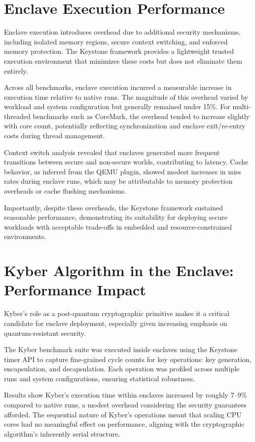 \section{Enclave Execution Performance}
Enclave execution introduces overhead due to additional security mechanisms, including isolated memory regions, secure context switching, and enforced memory protection. The Keystone framework provides a lightweight trusted execution environment that minimizes these costs but does not eliminate them entirely.

Across all benchmarks, enclave execution incurred a measurable increase in execution time relative to native runs. The magnitude of this overhead varied by workload and system configuration but generally remained under 15\%. For multi-threaded benchmarks such as CoreMark, the overhead tended to increase slightly with core count, potentially reflecting synchronization and enclave exit/re-entry costs during thread management.

Context switch analysis revealed that enclaves generated more frequent transitions between secure and non-secure worlds, contributing to latency. Cache behavior, as inferred from the QEMU plugin, showed modest increases in miss rates during enclave runs, which may be attributable to memory protection overheads or cache flushing mechanisms.

Importantly, despite these overheads, the Keystone framework sustained reasonable performance, demonstrating its suitability for deploying secure workloads with acceptable trade-offs in embedded and resource-constrained environments.

\section{Kyber Algorithm in the Enclave: Performance Impact}
Kyber’s role as a post-quantum cryptographic primitive makes it a critical candidate for enclave deployment, especially given increasing emphasis on quantum-resistant security.

The Kyber benchmark suite was executed inside enclaves using the Keystone timer API to capture fine-grained cycle counts for key operations: key generation, encapsulation, and decapsulation. Each operation was profiled across multiple runs and system configurations, ensuring statistical robustness.

Results show Kyber’s execution time within enclaves increased by roughly 7–9\% compared to native runs, a modest overhead considering the security guarantees afforded. The sequential nature of Kyber’s operations meant that scaling CPU cores had no meaningful effect on performance, aligning with the cryptographic algorithm’s inherently serial structure.

